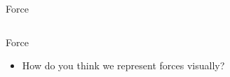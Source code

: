 \documentclass{beamer}
\begin{document}
\begin{frame}{Force}
\begin{columns}
\begin{column}{0.4\textwidth}
\begin{center}
\end{center}
\end{column}
\end{columns}
\end{frame}

\begin{frame}{Force}
\begin{itemize}
   \item How do you think we represent forces visually?
   \\~\\
\end{itemize}
\begin{center}
\end{center}
\end{frame}
\end{document}

